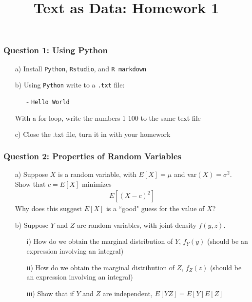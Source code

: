 \documentclass[12pt,letterpaper]{article}
\title{Text as Data: Homework 1}
\date{}
\begin{document}
\maketitle

\subsubsection*{Question 1: Using Python}
\begin{itemize}
\item[a)] Install {\tt Python}, {\tt Rstudio}, and {\tt R markdown}
\item[b)] Using {\tt Python} write to a {\tt .txt} file:
\begin{itemize}
\item[-] {\tt Hello World}
\end{itemize}
With a for loop, write the numbers 1-100 to the same text file
\item[c)] Close the .txt file, turn it in with your homework
\end{itemize}




\subsubsection*{Question 2: Properties of Random Variables}  
\begin{itemize}
\item[a)] Suppose $X$ is a random variable, with $E[X] = \mu$ and var$(X) = \sigma^2$.  Show that $c = E[X]$ minimizes
\begin{eqnarray}
E[ (X - c)^2] \nonumber 
\end{eqnarray}
Why does this suggest $E[X]$ is a ``good" guess for the value of $X$?
\item[b)]  Suppose $Y$ and $Z$ are random variables, with joint density $f(y, z)$.  
\begin{itemize}
\item[i)] How do we obtain the marginal distribution of $Y$, $f_{Y}(y)$ (should be an expression involving an integral)
\item[ii)] How do we obtain the marginal distribution of $Z$, $f_{Z}(z)$ (should be an expression involving an integral)
\item[iii)] Show that if $Y$ and $Z$ are independent, $E[YZ] = E[Y]E[Z]$
\end{itemize} 
\end{itemize}
\end{document}
